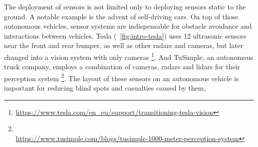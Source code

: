 The deployment of sensors is not limited only to deploying sensors static to the ground.
A notable example is the advent of self-driving cars.
On top of those autonomous vehicles, sensor systems are indispensable for obstacle avoidance and interactions between vehicles.
Tesla (~\ref{fig:intro-tesla}) uses 12 ultrasonic sensors 
near the front and rear bumper, as well as other radars and cameras,
but later changed into a vision system with only cameras 
\footnote{\url{https://www.tesla.com/en_eu/support/transitioning-tesla-vision}}. 
And TuSimple, an autonomous truck company, employs a combination of cameras, radars and lidars 
for their perception system \footnote{\\\url{https://www.tusimple.com/blogs/tusimple-1000-meter-perception-system}}. 
The layout of these sensors on an autonomous vehicle is important for reducing blind spots and casualties caused by them,

